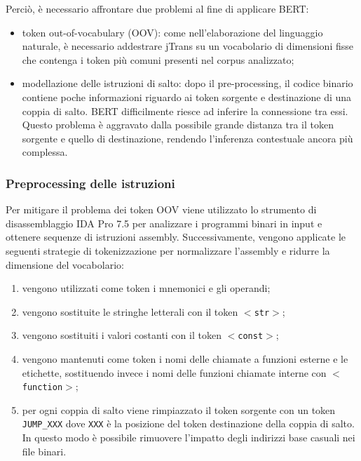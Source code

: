\documentclass[12pt,a4paper,openright,twoside]{report}
\begin{document}
 Perciò, è necessario affrontare due problemi al fine di applicare BERT:
 \begin{itemize}
     \item token out-of-vocabulary (OOV): come nell'elaborazione del linguaggio naturale, è necessario addestrare jTrans su un vocabolario di dimensioni fisse che contenga i token più comuni presenti nel corpus analizzato;
     \item modellazione delle istruzioni di salto: dopo il pre-processing, il codice binario contiene poche informazioni riguardo ai token sorgente e destinazione di una coppia di salto. BERT difficilmente riesce ad inferire la connessione tra essi. Questo problema è aggravato dalla possibile grande distanza tra il token sorgente e quello di destinazione, rendendo l'inferenza contestuale ancora più complessa.
 \end{itemize}


\subsubsection{Preprocessing delle istruzioni}
Per mitigare il problema dei token OOV viene utilizzato lo strumento di disassemblaggio IDA Pro 7.5 \cite{idapro} per analizzare i programmi binari in input e ottenere sequenze di istruzioni assembly. Successivamente, vengono applicate le seguenti strategie di tokenizzazione per normalizzare l'assembly e ridurre la dimensione del vocabolario:
\begin{enumerate}
    \item vengono utilizzati come token i mnemonici e gli operandi;
    \item vengono sostituite le stringhe letterali con il token \texttt{$<$str$>$};
    \item vengono sostituiti i valori costanti con il token \texttt{$<$const$>$};
    \item vengono mantenuti come token i nomi delle chiamate a funzioni esterne e le etichette, sostituendo invece i nomi delle funzioni chiamate interne con \texttt{$<$function$>$};
    \item per ogni coppia di salto viene rimpiazzato il token sorgente con un token \texttt{JUMP\_XXX} dove \texttt{XXX} è la posizione del token destinazione della coppia di salto. In questo modo è possibile rimuovere l'impatto degli indirizzi base casuali nei file binari.
\end{enumerate}
    
\end{document}
